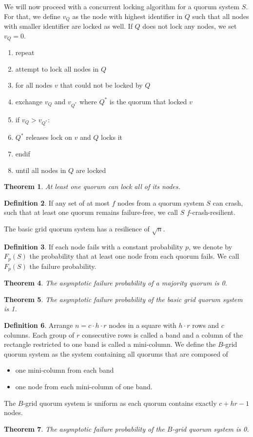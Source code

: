 \documentclass[a4paper, 12pt]{article}
\theoremstyle{plain}
\newtheorem{theorem}{Theorem}[section] %
\theoremstyle{definition}
\newtheorem{definition}[theorem]{Definition} %
\theoremstyle{lemma}
\theoremstyle{remark}
\theoremstyle{corollary}
\theoremstyle{example}
\begin{document}
	We will now proceed with a concurrent locking algorithm for a quorum system $S$. For that, we define $v_Q$ as the node with highest identifier in $Q$ such that all nodes with smaller identifier are locked as well. If $Q$ does not lock any nodes, we set $v_Q = 0$.
	\begin{enumerate}
		\item repeat
		\item attempt to lock all nodes in $Q$
		\item for all nodes $v$ that could not be locked by $Q$
		\item exchange $v_Q$ and $v_{Q^*}$ where $Q^*$ is the quorum that locked $v$
		\item if $v_Q > v_{Q^*}$:
		\item $Q^*$ releases lock on $v$ and $Q$ locks it
		\item endif
		\item until all nodes in $Q$ are locked
	\end{enumerate}
	\begin{theorem}
		At least one quorum can lock all of its nodes.
	\end{theorem}
	\begin{definition}
		If any set of at most $f$ nodes from a quorum system $S$ can crash, such that at least one quorum remains failure-free, we call $S$ $f$-crash-resilient.
	\end{definition}
	The basic grid quorum system has a resilience of $\sqrt{n}$.
	\begin{definition}
		If each node fails with a constant probability $p$, we denote by $F_p(S)$ the probability that at least one node from each quorum fails. We call $F_p(S)$ the failure probability.
	\end{definition}
	\begin{theorem}
		The asymptotic failure probability of a majority quorum is 0.
	\end{theorem}
	\begin{theorem}
		The asymptotic failure probability of the basic grid quorum system is 1.
	\end{theorem}
	\begin{definition}
		Arrange $n = c \cdot h \cdot r$ nodes in a square with $h\cdot r$ rows and $c$ columns. Each group of $r$ consecutive rows is called a band and a column of the rectangle restricted to one band is called a mini-column. We define the $B$-grid quorum system as the system containing all quorums that are composed of \begin{itemize}
			\item one mini-column from each band
			\item one node from each mini-column of one band.
		\end{itemize} 
		The $B$-grid quorum system is uniform as each quorum contains exactly $c+hr-1$ nodes.
	\end{definition}
	\begin{theorem}
		The asymptotic failure probability of the $B$-grid quorum system is 0.
	\end{theorem}
\end{document}
